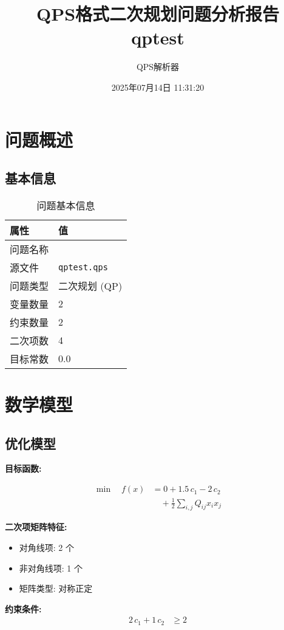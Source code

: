 \documentclass[a4paper,11pt]{article}
\title{QPS格式二次规划问题分析报告\\{\large qptest}}
\author{QPS解析器}
\date{2025年07月14日 11:31:20}
\begin{document}
\maketitle
\tableofcontents
\newpage

\section{问题概述}
\subsection{基本信息}
\begin{table}[h!]
\centering
\begin{tabular}{ll}
\toprule
\textbf{属性} & \textbf{值} \\
\midrule
问题名称 & \texttt{} \\
源文件 & \texttt{qptest.qps} \\
问题类型 & 二次规划 (QP) \\
变量数量 & 2 \\
约束数量 & 2 \\
二次项数 & 4 \\
目标常数 & 0.0 \\
\bottomrule
\end{tabular}
\caption{问题基本信息}
\end{table}

\section{数学模型}
\subsection{优化模型}

\textbf{目标函数:}

\begin{align}
\min\quad f(x) &= 0 + 1.5\,c_{1} - 2\,c_{2} \nonumber\\
&\quad + \frac{1}{2} \sum_{i,j} Q_{ij} x_i x_j\label{eq:objective}
\end{align}

\textbf{二次项矩阵特征:}
\begin{itemize}
\item 对角线项: 2 个
\item 非对角线项: 1 个
\item 矩阵类型: 对称正定
\end{itemize}

\textbf{约束条件:}
\begin{align}
2\,c_{1} + 1\,c_{2} &\geq 2 \nonumber
\end{align}
\end{document}

